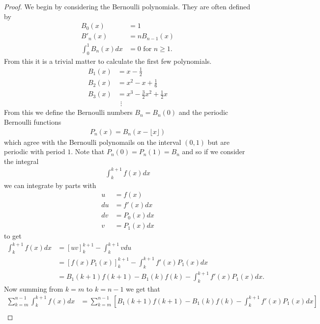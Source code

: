 \begin{proof}
    We begin by considering the Bernoulli polynomials. They are often defined \cite{Apostol1976} by
    \begin{align}
        B_0(x) &= 1 \\
        B'_n(x) &= nB_{n-1}(x) \\
        \int_0^1 B_n(x) dx &= 0 \text{ for } n \geq 1.
    \end{align}
    From this it is a trivial matter to calculate the first few polynomials.
    \begin{align}
        B_1(x) &= x - \frac{1}{2} \\
        B_2(x) &= x^2 - x + \frac{1}{6} \\
        B_3(x) &= x^3 - \frac{3}{2}x^2 + \frac{1}{2}x \\
            &  \ \ \vdots
    \end{align}
    From this we define the Bernoulli numbers $ B_n = B_n(0) $ and the periodic Bernoulli functions 
    \begin{align}
        P_n(x) = B_n(x - \lfloor x \rfloor)
    \end{align}
    which agree with the Bernoulli polynomails on the interval $ (0,1) $ but are periodic with period $ 1 $.
    Note that $ P_n(0) = P_n(1) = B_n $
    and so if we consider the integral
    \begin{align}
        \int_k^{k+1} f(x)dx 
    \end{align}
    we can integrate by parts with
    \begin{align}
        u &= f(x) \\
        du &= f'(x)dx \\
        dv &= P_0(x) dx \\
        v &= P_1(x) dx
    \end{align}
    to get
    \begin{align}
        \int_{k}^{k+1}f(x)dx &= [uv]_{k}^{k+1} - \int_k^{k+1} v du \\
            &= \left[ f(x)P_1(x) \right]_k^{k+1} - \int_{k}^{k+1} f'(x) P_1(x) dx \\
            &= B_1(k+1)f(k+1) - B_1(k)f(k) - \int_{k}^{k+1}f'(x)P_1(x) dx.
    \end{align}
    Now summing from $ k = m $ to $ k = n-1 $ we get that
    \begin{align}
        \sum_{k=m}^{n-1} \int_{k}^{k+1} f(x)dx &= \sum_{k=m}^{n-1} \left[ B_{1}(k+1)f(k+1) - B_1(k)f(k) - \int_{k}^{k+1}f'(x)P_1(x)dx\right] \\

\end{align}
\end{proof}
